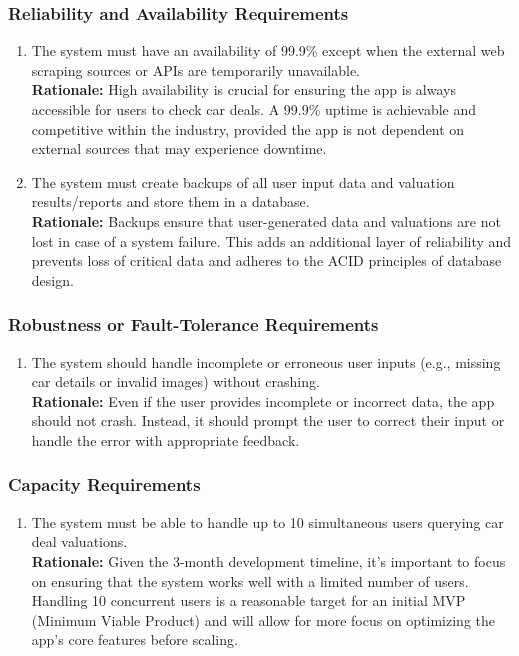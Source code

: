 \documentclass[]{article}
\begin{document}
\subsubsection{Reliability and Availability Requirements}
\label{ssub:reliability_and_availability_requirements}
\begin{enumerate}[{PR-RA}1.]
    \item The system must have an availability of 99.9\% except when the external web scraping sources or APIs are temporarily unavailable.  \\
    \textbf{Rationale:} High availability is crucial for ensuring the app is always accessible for users to check car deals. A 99.9\% uptime is achievable and competitive within the industry, provided the app is not dependent on external sources that may experience downtime. 

    \item The system must create backups of all user input data and valuation results/reports and store them in a database.  \\
    \textbf{Rationale:} Backups ensure that user-generated data and valuations are not lost in case of a system failure. This adds an additional layer of reliability and prevents loss of critical data and adheres to the ACID principles of database design.
\end{enumerate}

\subsubsection{Robustness or Fault-Tolerance Requirements}
\label{ssub:robustness_or_fault_tolerance_requirements}
\begin{enumerate}[{PR-RFT}1.]
    \item The system should handle incomplete or erroneous user inputs (e.g., missing car details or invalid images) without crashing.  \\
    \textbf{Rationale:} Even if the user provides incomplete or incorrect data, the app should not crash. Instead, it should prompt the user to correct their input or handle the error with appropriate feedback.
\end{enumerate}

\subsubsection{Capacity Requirements}
\label{ssub:capacity_requirements}
\begin{enumerate}[{PR-C}1.]
    \item The system must be able to handle up to 10 simultaneous users querying car deal valuations.  \\
    \textbf{Rationale:} Given the 3-month development timeline, it's important to focus on ensuring that the system works well with a limited number of users. Handling 10 concurrent users is a reasonable target for an initial MVP (Minimum Viable Product) and will allow for more focus on optimizing the app's core features before scaling.
\end{enumerate}
\end{document}
